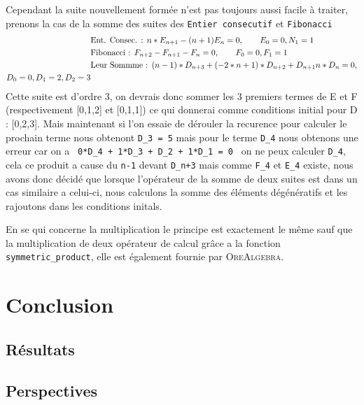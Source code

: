 \documentclass[12pt]{article}
\begin{document}
        \par Cependant la suite nouvellement formée n'est pas toujours aussi facile à traiter, prenons la cas
        de la somme des suites des  \texttt{Entier consecutif} et \texttt{Fibonacci}
        \begin{align*}
            &\textnormal{Ent. Consec. : } n*E_{n+1} - (n+1)E_n = 0, \qquad E_0 = 0, N_1 = 1\\
            &\textnormal{Fibonacci : } F_{n+2} - F_{n+1} - F_n = 0, \qquad F_0=0, F_1=1\\
            &\textnormal{Leur Sommme : } (n - 1)*D_{n+3} + (-2*n + 1)*D_{n+2} + D_{n+1} n*D_n = 0, \\
             D_0 = 0, D_1 = 2, D_2 = 3
        \end{align*} 
        Cette suite est d'ordre 3, on devrais donc sommer les 3 premiers termes de E et F (respectivement 
        [0,1,2] et [0,1,1]) ce qui donnerai comme conditions initial pour D : [0,2,3]. Mais maintenant si 
        l'on essaie de dérouler la recurence pour calculer le prochain terme nous obtenont \texttt{D\_3 = 5}
        mais pour le terme \texttt{D\_4} nous obtenons une erreur car on a \texttt{ 0*D\_4 + 1*D\_3 + D\_2 + 1*D\_1 = 0 }
        on ne  peux calculer \texttt{D\_4}, cela ce produit a cause du \texttt{n-1} devant \texttt{D\_{n+3}} 
        mais comme \texttt{F\_4} et \texttt{E\_4} existe, nous avons donc décidé que lorsque l'opérateur de la somme de deux suites est dans un cas similaire a celui-ci, nous calculons la somme des éléments dégénératifs et les 
        rajoutons dans les conditions initals.
        \par En se qui concerne la multiplication le principe est exactement le même sauf que la 
        multiplication de deux opérateur de calcul grâce a la fonction \texttt{symmetric\_product},
        elle est également fournie par \textsc{OreAlgebra}.

\setcounter{secnumdepth}{0}
\section{Conclusion}
    \subsection{Résultats}
    \subsection{Perspectives}
       

\end{document}
